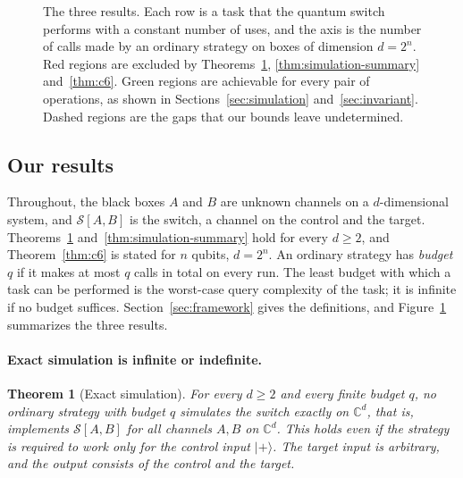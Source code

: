 \documentclass[11pt,letterpaper]{article}
\newtheorem{theorem}{Theorem}
\theoremstyle{definition}\newtheorem{definition}[theorem]{Definition}
\newcommand{\C}{\mathbb C}
\newcommand{\ket}[1]{\lvert#1\rangle}
\newcommand{\SW}{\mathcal S}
\newcommand{\reffig}[1]{Figure~\ref{#1}}
\begin{document}
\begin{figure}[t]
\caption{The three results. Each row is a task that the quantum switch
performs with a constant number of uses, and the axis is the number of
calls made by an ordinary strategy on boxes of dimension $d=2^n$. Red
regions are excluded by Theorems~\ref{thm:exact-simulation},
\ref{thm:simulation-summary} and~\ref{thm:c6}. Green regions are
achievable for every pair of operations, as shown in
Sections~\ref{sec:simulation} and~\ref{sec:invariant}. Dashed regions
are the gaps that our bounds leave undetermined.}
\label{fig:landscape}
\end{figure}

\subsection{Our results}\label{sec:results}

Throughout, the black boxes $A$ and $B$ are unknown channels on a
$d$-dimensional system, and $\SW[A,B]$ is the switch, a channel on the
control and the target. Theorems~\ref{thm:exact-simulation}
and~\ref{thm:simulation-summary} hold for every $d\ge2$, and
Theorem~\ref{thm:c6} is stated for $n$ qubits, $d=2^n$. An ordinary
strategy has \emph{budget} $q$ if it makes at most $q$ calls in total
on every run. The least budget with which a task can be performed is
the worst-case query complexity of the task; it is infinite if no
budget suffices. Section~\ref{sec:framework} gives the definitions, and
\reffig{fig:landscape} summarizes the three results.


\paragraph{Exact simulation is infinite or indefinite.}
\begin{theorem}[Exact simulation]\label{thm:exact-simulation}
For every $d\ge2$ and every finite budget $q$, no ordinary strategy with
budget $q$ simulates the switch exactly on $\C^d$, that is, implements
$\SW[A,B]$ for all channels $A,B$ on $\C^d$. This holds even if the
strategy is required to work only for the control input $\ket+$. The
target input is arbitrary, and the output consists of the control and
the target.
\end{theorem}
\end{document}
